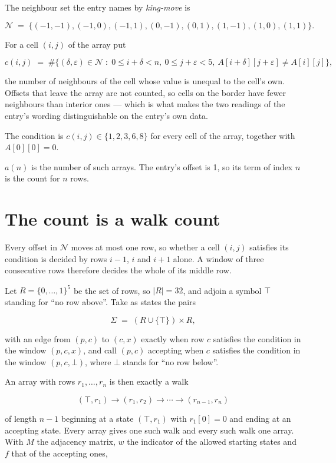 \documentclass[11pt]{article}
\theoremstyle{definition}
\begin{document}
The neighbour set the entry names by {\itshape king-move} is

\[\mathcal{N} \;=\; \{(-1,-1), (-1,0), (-1,1), (0,-1), (0,1), (1,-1), (1,0), (1,1)\}.\]

For a cell $(i,j)$ of the array put

\[c(i,j) \;=\; \#\bigl\{(\delta,\varepsilon)\in\mathcal{N} \;:\; 0\le i+\delta<n,\ 0\le j+\varepsilon<5,\ A[i+\delta][j+\varepsilon] \neq A[i][j]\bigr\},\]

the number of neighbours of the cell whose value is unequal to the cell's own. Offsets that leave the array are not counted, so cells on the border have fewer neighbours than interior ones --- which is what makes the two readings of the entry's wording distinguishable on the entry's own data.

The condition is $c(i,j) \in \{1, 2, 3, 6, 8\}$ for every cell of the array, together with $A[0][0]=0$.

$a(n)$ is the number of such arrays. The entry's offset is 1, so its term of index $n$ is the count for $n$ rows.

\section{The count is a walk count}

Every offset in $\mathcal{N}$ moves at most one row, so whether a cell $(i,j)$ satisfies its condition is decided by rows $i-1$, $i$ and $i+1$ alone. A window of three consecutive rows therefore decides the whole of its middle row.

Let $R = \{0,\dots,1\}^{5}$ be the set of rows, so $|R| = 32$, and adjoin a symbol $\top$ standing for ``no row above''. Take as states the pairs

\[\Sigma \;=\; (R \cup \{\top\}) \times R,\]

with an edge from $(p,c)$ to $(c,x)$ exactly when row $c$ satisfies the condition in the window $(p,c,x)$, and call $(p,c)$ accepting when $c$ satisfies the condition in the window $(p,c,\bot)$, where $\bot$ stands for ``no row below''.

An array with rows $r_1,\dots,r_n$ is then exactly a walk

\[(\top,r_1) \to (r_1,r_2) \to \cdots \to (r_{n-1},r_n)\]

of length $n-1$ beginning at a state $(\top,r_1)$ with $r_1[0]=0$ and ending at an accepting state. Every array gives one such walk and every such walk one array. With $M$ the adjacency matrix, $w$ the indicator of the allowed starting states and $f$ that of the accepting ones,
\end{document}
